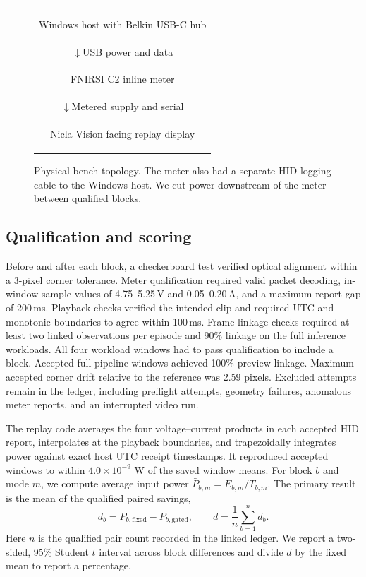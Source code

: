 \documentclass[10pt,letterpaper,twocolumn]{article}
\begin{document}
\begin{figure}[t]
\centering
\setlength{\tabcolsep}{2pt}
\small
\begin{tabular}{@{}c@{}}
\colorbox{softblue}{\strut Windows host with Belkin USB-C hub}\\[3pt]
\textcolor{rust}{\(\downarrow\)}\enspace USB power and data\\[2pt]
\colorbox{softblue}{\strut FNIRSI C2 inline meter}\\[3pt]
\textcolor{rust}{\(\downarrow\)}\enspace Metered supply and serial\\[2pt]
\colorbox{softblue}{\strut Nicla Vision facing replay display}
\end{tabular}
\caption{Physical bench topology. The meter also had a separate HID logging cable to the Windows host. We cut power downstream of the meter between qualified blocks.}
\label{fig:bench}
\end{figure}

\subsection{Qualification and scoring}
Before and after each block, a checkerboard test verified optical alignment within a 3-pixel corner tolerance. Meter qualification required valid packet decoding, in-window sample values of 4.75--5.25\,V and 0.05--0.20\,A, and a maximum report gap of 200\,ms. Playback checks verified the intended clip and required UTC and monotonic boundaries to agree within 100\,ms. Frame-linkage checks required at least two linked observations per episode and 90\% linkage on the full inference workloads. All four workload windows had to pass qualification to include a block. Accepted full-pipeline windows achieved 100\% preview linkage. Maximum accepted corner drift relative to the reference was 2.59 pixels. Excluded attempts remain in the ledger, including preflight attempts, geometry failures, anomalous meter reports, and an interrupted video run.

The replay code averages the four voltage--current products in each accepted HID report, interpolates at the playback boundaries, and trapezoidally integrates power against exact host UTC receipt timestamps. It reproduced accepted windows to within \(4.0\times10^{-9}\) W of the saved window means. For block \(b\) and mode \(m\), we compute average input power \(\bar P_{b,m}=E_{b,m}/T_{b,m}\). The primary result is the mean of the qualified paired savings,
\begin{equation*}
  d_b = \bar P_{b,\mathrm{fixed}} - \bar P_{b,\mathrm{gated}}, \qquad
  \bar d = \frac{1}{n}\sum_{b=1}^{n}d_b.
\end{equation*}
Here \(n\) is the qualified pair count recorded in the linked ledger. We report a two-sided, 95\% Student \(t\) interval across block differences and divide \(\bar d\) by the fixed mean to report a percentage.
\end{document}

